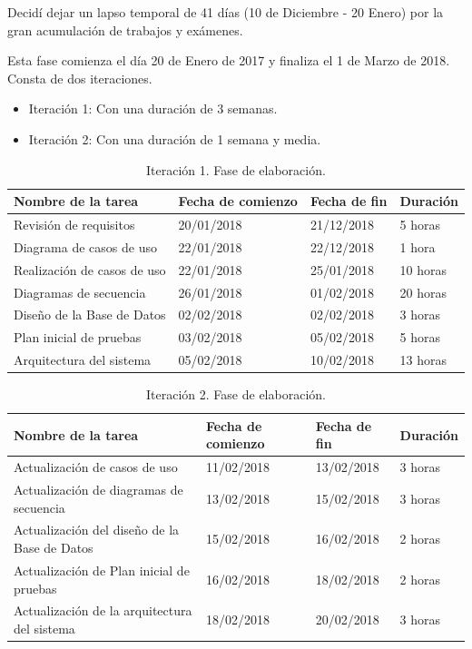 \documentclass[twoside]{report}
\begin{document}
Decidí dejar un lapso temporal de 41 días (10 de Diciembre - 20 Enero) por la gran acumulación de trabajos y exámenes.

Esta fase comienza el día 20 de Enero de 2017 y finaliza el 1 de Marzo de 2018. Consta de dos iteraciones.

\begin{itemize}
\item Iteración 1: Con una duración de 3 semanas.
\item Iteración 2: Con una duración de 1 semana y media.
\end{itemize}

\begin{table}[H]
\centering
\begin{tabular}{|l|l|l|l|}
\hline
Nombre de la tarea          & Fecha de comienzo & Fecha de fin & Duración \\ \hline
Revisión de requisitos      & 20/01/2018        & 21/12/2018   & 5 horas   \\ \hline
Diagrama de casos de uso    & 22/01/2018        & 22/12/2018   & 1 hora   \\ \hline
Realización de casos de uso & 22/01/2018        & 25/01/2018   & 10 horas  \\ \hline
Diagramas de secuencia      & 26/01/2018        & 01/02/2018   & 20 horas  \\ \hline
Diseño de la Base de Datos  & 02/02/2018        & 02/02/2018   & 3 horas   \\ \hline
Plan inicial de pruebas     & 03/02/2018        & 05/02/2018   & 5 horas   \\ \hline
Arquitectura del sistema    & 05/02/2018        & 10/02/2018   & 13 horas   \\ \hline
\end{tabular}
\caption{Iteración 1. Fase de elaboración.}
\end{table}


\begin{table}[H]
\centering
\begin{tabular}{|l|l|l|l|}
\hline
Nombre de la tarea                           & Fecha de comienzo & Fecha de fin & Duración \\ \hline
Actualización de casos de uso                & 11/02/2018        & 13/02/2018   & 3 horas   \\ \hline
Actualización de diagramas de secuencia      & 13/02/2018        & 15/02/2018   & 3 horas   \\ \hline
Actualización del diseño de la Base de Datos & 15/02/2018        & 16/02/2018   & 2 horas   \\ \hline
Actualización de Plan inicial de pruebas     & 16/02/2018        & 18/02/2018   & 2 horas   \\ \hline
Actualización de la arquitectura del sistema & 18/02/2018        & 20/02/2018   & 3 horas   \\ \hline
\end{tabular}
\caption{Iteración 2. Fase de elaboración.}
\end{table}
\end{document}
